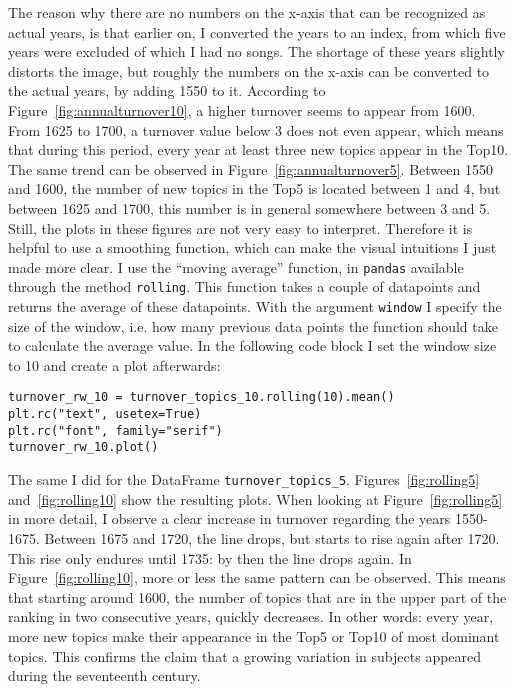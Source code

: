 The reason why there are no numbers on the x-axis that can be recognized as actual years, is that earlier on, I converted the years to an index, from which five years were excluded of which I had no songs. The shortage of these years slightly distorts the image, but roughly the numbers on the x-axis can be converted to the actual years, by adding 1550 to it. According to Figure~\ref{fig:annualturnover10}, a higher turnover seems to appear from 1600. From 1625 to 1700, a turnover value below 3 does not even appear, which means that during this period, every year at least three new topics appear in the Top10. The same trend can be observed in Figure~\ref{fig:annualturnover5}. Between 1550 and 1600, the number of new topics in the Top5 is located between 1 and 4, but between 1625 and 1700, this number is in general somewhere between 3 and 5. Still, the plots in these figures are not very easy to interpret. Therefore it is helpful to use a smoothing function, which can make the visual intuitions I just made more clear. I use the \enquote{moving average} function, in \texttt{pandas} available through the method \texttt{rolling}. This function takes a couple of datapoints and returns the average of these datapoints. With the argument \texttt{window} I specify the size of the window, i.e. how many previous data points the function should take to calculate the average value. In the following code block I set the window size to 10 and create a plot afterwards:

\begin{lstlisting}
turnover_rw_10 = turnover_topics_10.rolling(10).mean()
plt.rc("text", usetex=True)
plt.rc("font", family="serif")
turnover_rw_10.plot()
\end{lstlisting}

\noindent The same I did for the DataFrame \texttt{turnover\_topics\_5}. Figures~\ref{fig:rolling5} and~\ref{fig:rolling10} show the resulting plots. When looking at Figure~\ref{fig:rolling5} in more detail, I observe a clear increase in turnover regarding the years 1550-1675. Between 1675 and 1720, the line drops, but starts to rise again after 1720. This rise only endures until 1735: by then the line drops again. In Figure~\ref{fig:rolling10}, more or less the same pattern can be observed. This means that starting around 1600, the number of topics that are in the upper part of the ranking in two consecutive years, quickly decreases. In other words: every year, more new topics make their appearance in the Top5 or Top10 of most dominant topics. This confirms the claim that a growing variation in subjects appeared during the seventeenth century.

